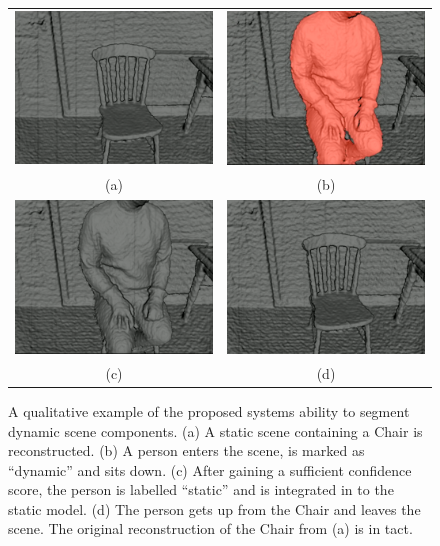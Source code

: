 \begin{figure}[h]
  \label{fig:moseg_qualitative_chair}
  \centering
  \begin{tabular}{cc}
    \includegraphics[height=.25\linewidth]{figures/moseg/chair0.png} &
    \includegraphics[height=.25\linewidth]{figures/moseg/chair1.png} \\
    (a) & (b) \\
    \includegraphics[height=.25\linewidth]{figures/moseg/chair2.png} &
    \includegraphics[height=.25\linewidth]{figures/moseg/chair3.png} \\
    (c) & (d)
  \end{tabular}
  \caption[Motion Segmentation Qualitative Results II]
  {A qualitative example of the proposed systems ability to segment
    dynamic scene components.
    (a) A static scene containing a Chair is reconstructed.
    (b) A person enters the scene, is marked as ``dynamic'' and sits down.
    (c) After gaining a sufficient confidence score, the person is labelled
    ``static'' and is integrated in to the static model.
    (d) The person gets up from the Chair and leaves the scene. The original
    reconstruction of the Chair from (a) is in tact.}
\end{figure}

